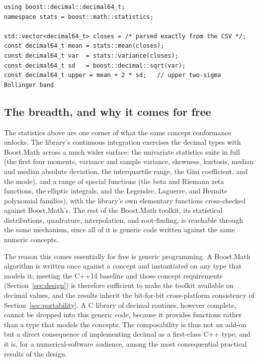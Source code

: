 \documentclass[acmsmall]{acmart}
\begin{document}
\begin{lstlisting}[caption={Boost.Math's statistics algorithms run on a vector of decimals
  with no decimal-specific code; the Bollinger band follows from the mean and the standard
  deviation.},label={lst:stats}]
using boost::decimal::decimal64_t;
namespace stats = boost::math::statistics;

std::vector<decimal64_t> closes = /* parsed exactly from the CSV */;
const decimal64_t mean = stats::mean(closes);
const decimal64_t var  = stats::variance(closes);
const decimal64_t sd   = boost::decimal::sqrt(var);
const decimal64_t upper = mean + 2 * sd;   // upper two-sigma Bollinger band
\end{lstlisting}

\subsection{The breadth, and why it comes for free}
The statistics above are one corner of what the same concept conformance unlocks. The
library's continuous integration exercises the decimal types with Boost.Math across a much
wider surface: the univariate statistics suite in full (the first four moments, variance
and sample variance, skewness, kurtosis, median and median absolute deviation, the
interquartile range, the Gini coefficient, and the mode), and a range of special functions
(the beta and Riemann zeta functions, the elliptic integrals, and the Legendre, Laguerre,
and Hermite polynomial families), with the library's own elementary functions cross-checked
against Boost.Math's. The rest of the Boost.Math toolkit, its statistical distributions,
quadrature, interpolation, and root-finding, is reachable through the same mechanism, since
all of it is generic code written against the same numeric concepts.

The reason this comes essentially for free is generic programming. A Boost.Math algorithm
is written once against a concept and instantiated on any type that models it; meeting the
C++14 baseline and those concept requirements (Section~\ref{sec:design}) is therefore
sufficient to make the toolkit available on decimal values, and the results inherit the
bit-for-bit cross-platform consistency of Section~\ref{sec:portability}. A C library of
decimal routines, however complete, cannot be dropped into this generic code, because it
provides functions rather than a type that models the concepts. The composability is thus
not an add-on but a direct consequence of implementing decimal as a first-class C++ type,
and it is, for a numerical-software audience, among the most consequential practical
results of the design.
\end{document}
